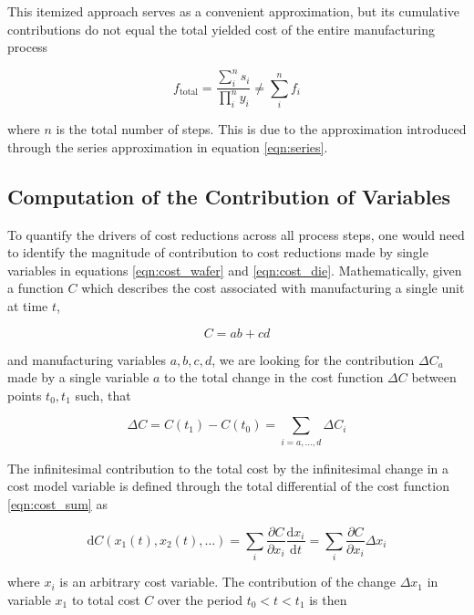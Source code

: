 \documentclass[10pt]{article}
\begin{document}
This itemized approach serves as a convenient approximation, but its cumulative contributions do not equal the total yielded cost of the entire manufacturing process

\begin{equation}
    f_\text{total} = \frac{\sum_i^n s_i}{\prod_i^ny_i} \neq \sum_i^n f_i
\end{equation}

where $n$ is the total number of steps. This is due to the approximation introduced through the series approximation in equation \cref{eqn:series}.

\subsection{Computation of the Contribution of Variables}

To quantify the drivers of cost reductions across all process steps, one would need to identify the magnitude of contribution to cost reductions made by single variables in equations \cref{eqn:cost_wafer} and \cref{eqn:cost_die}. Mathematically, given a function $C$ which describes the cost associated with manufacturing a single unit at time $t$,

\begin{equation}
C=ab+cd
\end{equation}

and manufacturing variables $a,b,c,d$, we are looking for the contribution $\Delta C_{a}$ made by a single variable $a$ to the total change in the cost function $\Delta C$ between points $t_0,t_1$ such, that

\begin{equation}
\Delta C = C(t_1)-C(t_0) = \sum_{i=a, \dots, d} \Delta C_i
\end{equation}

The infinitesimal contribution to the total cost by the infinitesimal change in a cost model variable is defined through the total differential of the cost function \cref{eqn:cost_sum} as

\begin{equation}
\text{d}C(x_1 (t), x_2(t), \dots) = \sum_i \frac{\partial C }{\partial x_i}     \frac{\text{d}x_i}{\text{d}t} = \sum_i \frac{\partial C }{\partial x_i}  \Delta x_i
\end{equation}

where $x_i$ is an arbitrary cost variable. The contribution of the change $\Delta x_1$ in variable $x_1$ to total cost $C$ over the period $t_0 < t < t_1 $ is then
\end{document}
